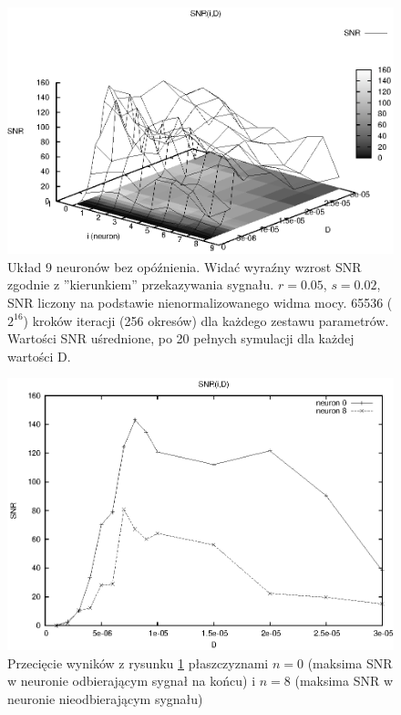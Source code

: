   \begin{figure}
    \includegraphics[width=140mm]{images/9neuron/2010_12_07_01}
    \caption{Układ 9 neuronów bez opóźnienia. Widać wyraźny wzrost SNR zgodnie z ''kierunkiem'' przekazywania sygnału. $r=0.05$, $s=0.02$, SNR liczony na podstawie nienormalizowanego widma mocy. 65536 ($2^{16}$) kroków iteracji (256 okresów) dla każdego zestawu parametrów. Wartości SNR uśrednione, po 20 pełnych symulacji dla każdej wartości D.}
    \label{fig:graphics:sim:2010_12_07_01}
  \end{figure}

  \begin{figure}
    \includegraphics[width=140mm]{images/9neuron/2010_12_07_02}
    \caption{Przecięcie wyników z rysunku \ref{fig:graphics:sim:2010_12_07_01} płaszczyznami $n=0$ (maksima SNR w neuronie odbierającym sygnał na końcu) i $n=8$ (maksima SNR w neuronie nieodbierającym sygnału)}
    \label{fig:graphics:sim:2010_12_07_02}
  \end{figure}

